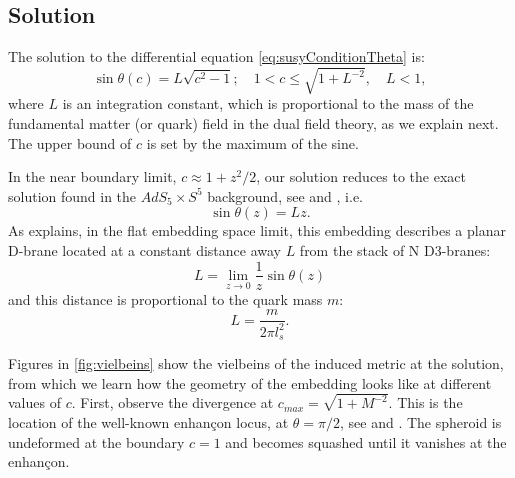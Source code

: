 \subsection{Solution}

The solution to the differential equation \eqref{eq:susyConditionTheta} is:
\begin{equation}\label{eq:susyConditionSolution}
\boxed{\sin\theta(c) = L \sqrt{c^2-1}; \quad 1 < c \leq \sqrt{1+L^{-2}}, \quad L < 1},
\end{equation}
where $L$ is an integration constant, which is proportional to the mass of the fundamental matter (or quark) field in the dual field theory, as we explain next. The upper bound of $c$ is set by the maximum of the sine.

In the near boundary limit, $c \approx 1 + z^2/2$, our solution reduces to the exact solution found in the $AdS_5 \times S^5$ background, see \cite{Karch:2002sh} and \cite{Karch:2005ms}, i.e.
\begin{equation}
 \sin\theta(z) = L z.
\end{equation}
As \cite{Karch:2005ms} explains, in the flat embedding space limit, this embedding describes a planar D-brane located at a constant distance away $L$ from the stack of N D3-branes:
\begin{equation}
 L = \lim_{z \rightarrow 0 } \frac{1}{z} \sin\theta(z)
\end{equation}
and this distance is proportional to the quark mass $m$:
\begin{equation}
 L = \dfrac{m}{2 \pi l_s^2}.
\end{equation}


Figures in \ref{fig:vielbeins} show the vielbeins of the induced metric at the solution, from which we learn how the geometry of the embedding looks like at different values of $c$. First, observe the divergence at $c_{max}=\sqrt{1+M^{-2}}$. This is the location of the well-known enhançon locus, at $\theta = \pi/2$, see \cite{Buchel:2000cn} and \cite{Evans:2000ct}. The spheroid is undeformed at the boundary $c=1$ and becomes squashed until it vanishes at the enhançon. 

